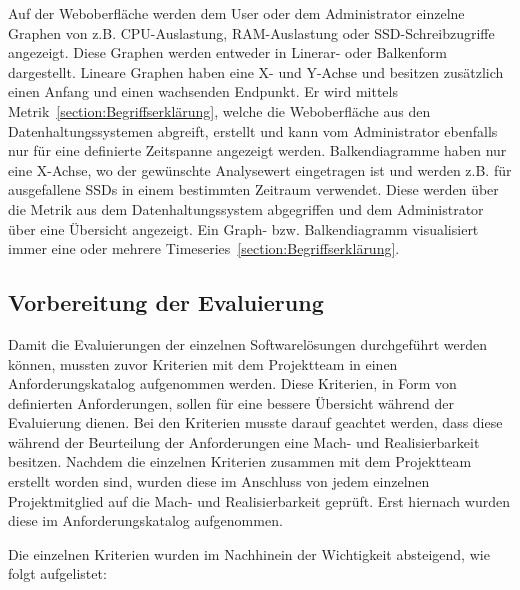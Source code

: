 Auf der Weboberfläche werden dem User oder dem Administrator einzelne Graphen
von z.B. CPU-Auslastung, RAM-Auslastung oder SSD-Schreibzugriffe angezeigt.
Diese Graphen werden entweder in Linerar- oder Balkenform dargestellt.
Lineare Graphen haben eine X- und Y-Achse und besitzen zusätzlich einen
Anfang und einen wachsenden Endpunkt. Er wird mittels
Metrik~\ref{section:Begriffserklärung}, welche die Weboberfläche aus den
Datenhaltungssystemen abgreift, erstellt und kann vom Administrator ebenfalls
nur für eine definierte Zeitspanne angezeigt werden. Balkendiagramme haben nur
eine X-Achse, wo der gewünschte Analysewert eingetragen ist und werden z.B. für
ausgefallene SSDs in einem bestimmten Zeitraum verwendet. Diese werden über die
Metrik aus dem Datenhaltungssystem abgegriffen und dem Administrator über eine
Übersicht angezeigt. Ein Graph- bzw. Balkendiagramm visualisiert immer eine oder
mehrere Timeseries~\ref{section:Begriffserklärung}.

\subsection{Vorbereitung der Evaluierung}
\label{subsec:vorbereiten_der_evaluierung_frontend}
Damit die Evaluierungen der einzelnen Softwarelösungen durchgeführt werden
können, mussten zuvor Kriterien mit dem Projektteam in einen
Anforderungskatalog aufgenommen werden. Diese Kriterien, in Form von
definierten Anforderungen, sollen für eine bessere Übersicht während der
Evaluierung dienen. Bei den Kriterien musste darauf geachtet werden, dass
diese während der Beurteilung der Anforderungen eine Mach- und
Realisierbarkeit besitzen. Nachdem die einzelnen Kriterien zusammen mit dem
Projektteam erstellt worden sind, wurden diese im Anschluss von jedem einzelnen
Projektmitglied auf die Mach- und Realisierbarkeit geprüft. Erst hiernach
wurden diese im Anforderungskatalog aufgenommen.

Die einzelnen Kriterien wurden im Nachhinein der Wichtigkeit absteigend,
wie folgt aufgelistet:

